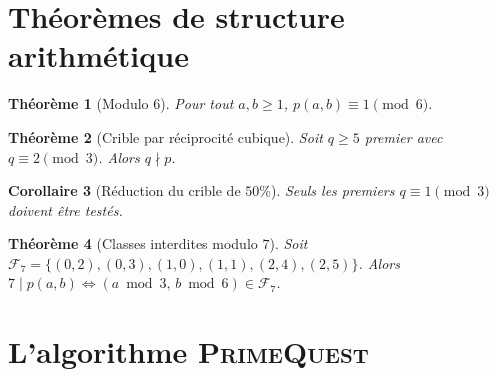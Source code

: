 \documentclass[11pt,a4paper]{article}
\newtheorem{theoreme}{Théorème}[section]
\newtheorem{corollaire}[theoreme]{Corollaire}
\theoremstyle{definition}
\theoremstyle{remark}
\newcommand{\F}{\mathcal{F}}
\begin{document}
\section{Théorèmes de structure arithmétique}\label{sec:filtres}

\begin{rigorousbox}
\begin{theoreme}[Modulo $6$]\label{thm:mod6}
Pour tout $a,b\geq 1$, $p(a,b)\equiv 1\pmod{6}$.
\end{theoreme}
\end{rigorousbox}

\begin{rigorousbox}
\begin{theoreme}[Crible par réciprocité cubique]\label{thm:cubique}
Soit $q\geq 5$ premier avec $q\equiv 2\pmod{3}$. Alors $q\nmid p$.
\end{theoreme}
\end{rigorousbox}

\begin{corollaire}[Réduction du crible de $50\%$]\label{cor:crible-50}
Seuls les premiers $q\equiv 1\pmod{3}$ doivent être testés.
\end{corollaire}

\begin{rigorousbox}
\begin{theoreme}[Classes interdites modulo $7$]\label{thm:mod7}
Soit $\F_7 = \{(0,2),(0,3),(1,0),(1,1),(2,4),(2,5)\}$.
Alors $7\mid p(a,b) \Leftrightarrow (a\bmod 3,\,b\bmod 6)\in\F_7$.
\end{theoreme}
\end{rigorousbox}

\section{L'algorithme \textsc{PrimeQuest}}\label{sec:algo}
\end{document}
